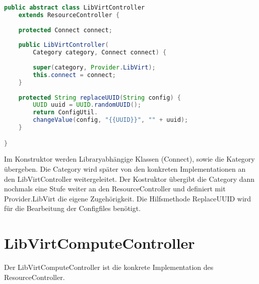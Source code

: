 \begin{lstlisting}[language=Java,frame=single] 
public abstract class LibVirtController 
	extends ResourceController {
	
	protected Connect connect;
	
	public LibVirtController(
		Category category, Connect connect) {
		
		super(category, Provider.LibVirt);
		this.connect = connect;
	}
	
	protected String replaceUUID(String config) {
		UUID uuid = UUID.randomUUID();
		return ConfigUtil.
		changeValue(config, "{{UUID}}", "" + uuid);
	}

}
\end{lstlisting}
Im Konstruktor werden Libraryabhängige Klassen (Connect), sowie die Kategory übergeben. Die Category wird später von den konkreten Implementationen an den LibVirtController weitergeleitet. Der Kostruktor übergibt die Category dann nochmals eine Stufe weiter an den ResourceController und definiert mit Provider.LibVirt die eigene Zugehörigkeit.
Die Hilfsmethode ReplaceUUID wird für die Bearbeitung der Configfiles benötigt.

\newpage
\section{LibVirtComputeController}
Der LibVirtComputeController ist die konkrete Implementation des ResourceController.

